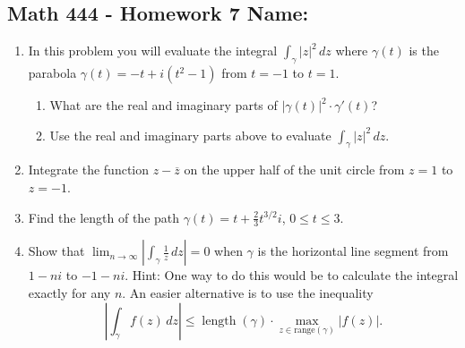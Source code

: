 \documentclass[11pt]{article}
\newcommand{\ds}{\displaystyle}
\begin{document}
\pagestyle{empty} 
\subsection*{Math 444 - Homework 7 \hfill Name: \underline{\hspace*{2in}}}

\begin{enumerate}

\item In this problem you will evaluate the integral $\ds \int_\gamma |z|^2 \, dz$ where $\gamma(t)$ is the parabola $\gamma(t) = -t + i(t^2-1)$ from $t=-1$ to $t = 1$. 
\begin{enumerate}
\item What are the real and imaginary parts of $|\gamma(t)|^2 \cdot \gamma'(t)$?
\vfill

\item Use the real and imaginary parts above to evaluate $\ds \int_\gamma |z|^2 \, dz$.
\end{enumerate}
\vfill

\item Integrate the function $z - \overline{z}$ on the upper half of the unit circle from $z=1$ to $z=-1$. 
\vfill




\item Find the length of the path $\gamma(t) = t + \tfrac{2}{3} t^{3/2} i$, $0 \le t \le 3$.  
\vfill 


\newpage

\item Show that $\ds \lim_{n \rightarrow \infty} \left| \int_\gamma \frac{1}{z} \, dz \right|=0$ when $\gamma$ is the horizontal line segment from $1-ni$ to $-1 - ni$. Hint: One way to do this would be to calculate the integral exactly for any $n$. An easier alternative is to use the inequality
$$\left| \int_\gamma f(z) \, dz \right| \le \operatorname{length}(\gamma) \cdot \max_{z \in \text{range}(\gamma)} |f(z)|.$$
\vfill  
\vfill  
\vfill  

\setcounter{enumCount}{\theenumi}
\end{enumerate}
\end{document}
